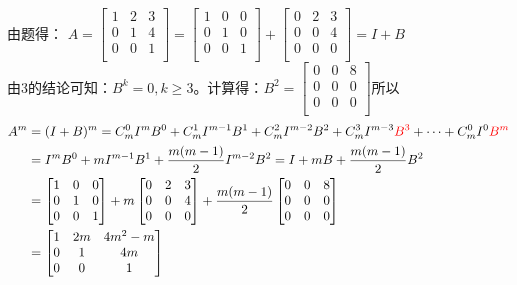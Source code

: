 \documentclass{article}
\begin{document}
\begin{jie}

由题得：
$
A=
\begin{bmatrix}
  1&2&3\\
  0&1&4\\
  0&0&1\\
\end{bmatrix}=
\begin{bmatrix}
1&0&0\\
  0&1&0\\
  0&0&1\\
\end{bmatrix}+
\begin{bmatrix}
  0&2&3\\
  0&0&4\\
  0&0&0\\
\end{bmatrix}=I+B
$\\

由3的结论可知：$B^{k}=0,k\geq3$。计算得：$B^{2}=\begin{bmatrix}
                                        0 & 0&8 \\
                                       0 & 0&0 \\  0 & 0&0 \\
                                      \end{bmatrix}$所以
\begin{align*}
A^{m}&=(I+B)^{m}=C_{m}^{0}I^{m}B^{0}+C_{m}^{1}I^{m-1}B^{1}+C_{m}^{2}I^{m-2}B^{2}+C_{m}^{3}I^{m-3}\textcolor[rgb]{1.00,0.00,0.00}{B^{3}}+\cdots+C_{m}^{0}I^{0}\textcolor[rgb]{1.00,0.00,0.00}{B^{m}}\\
&=I^{m}B^{0}+mI^{m-1}B^{1}+\frac{m(m-1)}{2}I^{m-2}B^{2}=I+mB+\frac{m(m-1)}{2}B^{2}\\
&=\begin{bmatrix}
1&0&0\\
  0&1&0\\
  0&0&1\\
\end{bmatrix}+m\begin{bmatrix}
  0&2&3\\
  0&0&4\\
  0&0&0\\
\end{bmatrix}+\frac{m(m-1)}{2}
\begin{bmatrix}
                                        0 & 0&8 \\
                                       0 & 0&0 \\  0 & 0&0 \\
                                      \end{bmatrix}\\
&=
\begin{bmatrix}
  1&2m&4m^{2}-m\\
  0&1&4m\\
  0&0&1\\
\end{bmatrix}
\end{align*}
\end{jie}
\end{document}
